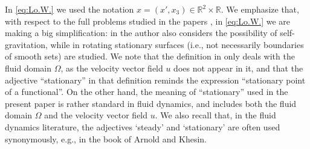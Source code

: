 \documentclass[10pt,reqno,a4paper]{article}
\numberwithin{equation}{section}
\theoremstyle{plain}
\theoremstyle{definition}
\newcommand{\R}{{\mathbb R}}
\newcommand{\Om}{\Omega}
\newcommand{\la}{\langle}
\newcommand{\ra}{\rangle}
\newcommand{\pa}{\partial}
\renewcommand{\div}{\operatorname{div}} %
\newcommand{\curl}{\operatorname{curl}}
\def\maindefinition#1#2#3{\par \medskip \noindent {\bf Definition~\mref{#1}}~(#2).~%
  {\textit{#3}}%
}
\def\mref#1{\Alph{#1}}
\begin{document}
In \eqref{eq:Lo.W.} we used the notation $x=(x',x_3)\in \R^2\times \R$.
We emphasize that, %
with respect to the full problems studied in the papers \cite{Lo, W}, 
in \eqref{eq:Lo.W.} we are making a big simplification: %
in \cite{W} the author also considers the possibility of self-gravitation, 
while in \cite{Lo} rotating stationary surfaces 
(i.e., not necessarily boundaries of smooth sets) are studied.
We note that the definition in \cite{Lo,W} %
only deals with the fluid domain $\Om$,   
as the velocity vector field $u$ does not appear in it, 
and that the adjective ``stationary'' in that definition %
reminds the expression ``stationary point of a functional''. 
On the other hand, the meaning of ``stationary'' 
used in the present paper is rather standard in fluid dynamics,   
and includes both the fluid domain $\Om$ and the velocity vector field $u$. 
We also recall that, in the fluid dynamics literature, the adjectives `steady' and `stationary' 
are often used synonymously, e.g., in the book \cite{AK} of Arnold and Khesin.

%
\end{document}
